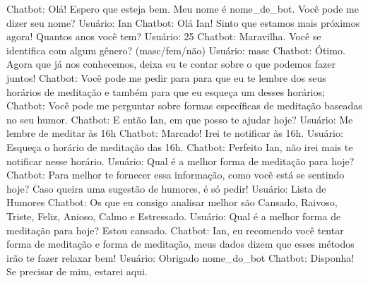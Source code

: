 Chatbot: Olá! Espero que esteja bem. Meu nome é {nome_de_bot}. Você pode me dizer seu nome?
Usuário: Ian
Chatbot: Olá Ian! Sinto que estamos mais próximos agora! Quantos anos você tem?
Usuário: 25
Chatbot: Maravilha. Você se identifica com algum gênero? (masc/fem/não)
Usuário: masc
Chatbot: Ótimo. Agora que já nos conhecemos, deixa eu te contar sobre o que podemos fazer juntos! 
Chatbot: Você pode me pedir para para que eu te lembre dos seus horários de meditação e também para que eu esqueça um desses horários;
Chatbot: Você pode me perguntar sobre formas específicas de meditação baseadas no seu humor.
Chatbot: E então Ian, em que posso te ajudar hoje?
Usuário: Me lembre de meditar às 16h
Chatbot: Marcado! Irei te notificar às 16h.
Usuário: Esqueça o horário de meditação das 16h.
Chatbot: Perfeito Ian, não irei mais te notificar nesse horário.
Usuário: Qual é a melhor forma de meditação para hoje?
Chatbot: Para melhor te fornecer essa informação, como você está se sentindo hoje? Caso queira uma sugestão de humores, é só pedir!
Usuário: Lista de Humores
Chatbot: Os que eu consigo analisar melhor são Cansado, Raivoso, Triste, Feliz, Anioso, Calmo e Estressado.
Usuário: Qual é a melhor forma de meditação para hoje? Estou cansado.
Chatbot: Ian, eu recomendo você tentar {forma de meditação} e {forma de meditação}, meus dados dizem que esses métodos irão te fazer relaxar bem!
Usuário: Obrigado {nome_do_bot}
Chatbot: Disponha! Se precisar de mim, estarei aqui.